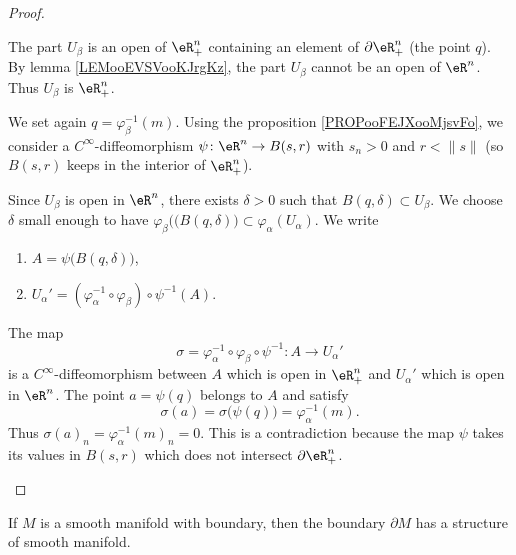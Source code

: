\begin{proof}
\begin{subproof}
		\begin{subproof}
			The part \( U_{\beta}\) is an open of \( \eR^n_+\) containing an element of \( \partial \eR^n_+\) (the point \( q\)). By lemma \ref{LEMooEVSVooKJrgKz}, the part \( U_{\beta}\) cannot be an open of \( \eR^n\). Thus \( U_{\beta}\) is \( \eR^n_+\).

			We set again \( q=\varphi_{\beta}^{-1}(m)\). Using the proposition  \ref{PROPooFEJXooMjsvFo}, we consider a \( C^{\infty}\)-diffeomorphism \(\psi \colon \eR^n\to B(s,r)  \) with \( s_n>0\) and \( r<\| s \|\) (so \( B(s,r)\) keeps in the interior of \( \eR^n_+\)).

			Since \( U_{\beta}\) is open in \( \eR^n\), there exists \( \delta>0\) such that \( B(q,\delta)\subset U_{\beta}\). We choose \( \delta\) small enough to have \( \varphi_{\beta}(\big( B(q,\delta) \big)\subset \varphi_{\alpha}(U_{\alpha})\). We write
			\begin{enumerate}
				\item
				      \( A=\psi\big( B(q,\delta) \big)\),
				\item
				      \( U_{\alpha}'=(\varphi_{\alpha}^{-1}\circ\varphi_{\beta})\circ\psi^{-1}(A)\).
			\end{enumerate}
			The map
			\begin{equation}
				\sigma=\varphi_{\alpha}^{-1}\circ\varphi_{\beta}\circ\psi^{-1} \colon A\to U_{\alpha}'
			\end{equation}
			is a \( C^{\infty}\)-diffeomorphism between \( A\) which is open in \( \eR^n_+\) and \( U_{\alpha}'\) which is open in \( \eR^n\). The point \( a=\psi(q)\) belongs to \( A\) and satisfy
			\begin{equation}
				\sigma(a)=\sigma\big( \psi(q) \big)=\varphi_{\alpha}^{-1}(m).
			\end{equation}
			Thus \( \sigma(a)_n=\varphi_{\alpha}^{-1}(m)_n=0 \). This is a contradiction because the map \( \psi\) takes its values in \( B(s,r)\) which does not intersect \( \partial \eR^n_+\).
		\end{subproof}
	\end{subproof}
\end{proof}

\begin{proposition}	\label{PROPooTENAooDxIAbf}
	If \( M\) is a smooth manifold with boundary, then the boundary \( \partial M\) has a structure of smooth manifold.
\end{proposition}

